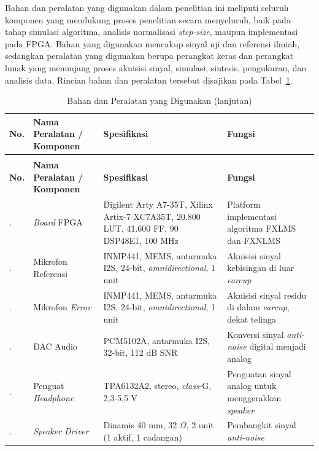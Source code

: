 Bahan dan peralatan yang digunakan dalam penelitian ini meliputi seluruh komponen yang mendukung proses penelitian secara menyeluruh, baik pada tahap simulasi algoritma, analisis normalisasi \emph{step-size}, maupun implementasi pada FPGA. Bahan yang digunakan mencakup sinyal uji dan referensi ilmiah, sedangkan peralatan yang digunakan berupa perangkat keras dan perangkat lunak yang menunjang proses akuisisi sinyal, simulasi, sintesis, pengukuran, dan analisis data. Rincian bahan dan peralatan tersebut disajikan pada Tabel~\ref{tab:bahan_peralatan}.

\begingroup
\small
\renewcommand{\arraystretch}{1.3}
\begin{longtable}{|>{\centering\arraybackslash}p{0.8cm}|>{\raggedright\arraybackslash}p{3.3cm}|>{\raggedright\arraybackslash}p{5.2cm}|>{\raggedright\arraybackslash}p{4.6cm}|}
  \caption{Bahan dan Peralatan yang Digunakan}
  \label{tab:bahan_peralatan} \\
  \hline
  \textbf{No.} & \textbf{Nama Peralatan / Komponen} & \textbf{Spesifikasi} & \textbf{Fungsi} \\
  \hline
  \endfirsthead
  \caption[]{Bahan dan Peralatan yang Digunakan (lanjutan)} \\
  \hline
  \textbf{No.} & \textbf{Nama Peralatan / Komponen} & \textbf{Spesifikasi} & \textbf{Fungsi} \\
  \hline
  \endhead
  1. & \emph{Board} FPGA & Digilent Arty A7-35T, Xilinx Artix-7 XC7A35T, 20.800 LUT, 41.600 FF, 90 DSP48E1, 100 MHz & Platform implementasi algoritma FXLMS dan FXNLMS \\
  \hline
  2. & Mikrofon Referensi & INMP441, MEMS, antarmuka I2S, 24-bit, \emph{omnidirectional}, 1 unit & Akuisisi sinyal kebisingan di luar \emph{earcup} \\
  \hline
  3. & Mikrofon \emph{Error} & INMP441, MEMS, antarmuka I2S, 24-bit, \emph{omnidirectional}, 1 unit & Akuisisi sinyal residu di dalam \emph{earcup}, dekat telinga \\
  \hline
  4. & DAC Audio & PCM5102A, antarmuka I2S, 32-bit, 112 dB SNR & Konversi sinyal \emph{anti-noise} digital menjadi analog \\
  \hline
  5. & Penguat \emph{Headphone} & TPA6132A2, stereo, \emph{class}-G, 2,3-5,5 V & Penguatan sinyal analog untuk menggerakkan \emph{speaker} \\
  \hline
  6. & \emph{Speaker Driver} & Dinamis 40 mm, 32 $\Omega$, 2 unit (1 aktif, 1 cadangan) & Pembangkit sinyal \emph{anti-noise} \\
  \hline

\end{longtable}
